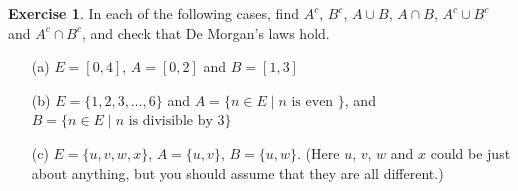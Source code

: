 \documentclass[a4paper]{book}
\newcommand{\st}        {\;|\;}
\renewcommand{\:}{\colon}
\theoremstyle{definition}
\newtheorem{exercise}[theorem]{Exercise}
\begin{document}
\begin{exercise}
 In each of the following cases, find $A^c$, $B^c$, $A\cup B$,
 $A\cap B$, $A^c\cup B^c$ and $A^c\cap B^c$, and check that De
 Morgan's laws hold.
 \begin{itemize}
  \item[(a)] $E=[0,4]$, $A=[0,2]$ and $B=[1,3]$
  \item[(b)] $E=\{1,2,3,\dotsc,6\}$ and 
   $A=\{n\in E\st n \text{ is even }\}$,
   and $B=\{n\in E\st n \text{ is divisible by } 3\}$
  \item[(c)] $E=\{u,v,w,x\}$, $A=\{u,v\}$, $B=\{u,w\}$.  (Here $u$, $v$,
   $w$ and $x$ could be just about anything, but you should assume
   that they are all different.)
 \end{itemize}
\end{exercise}
\end{document}
